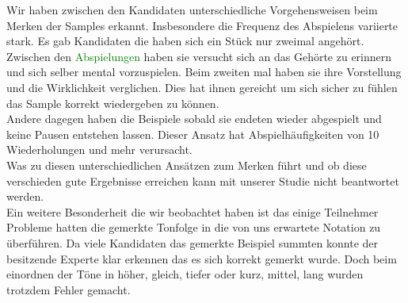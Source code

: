\documentclass{acm_proc_article-sp}
\begin{document}
Wir haben zwischen den Kandidaten unterschiedliche Vorgehensweisen beim Merken der Samples erkannt. Insbesondere die Frequenz des Abspielens variierte stark. Es gab Kandidaten die haben sich ein Stück nur zweimal angehört. Zwischen den \textcolor{green}{Abspielungen} haben sie versucht sich an das Gehörte zu erinnern und sich selber mental vorzuspielen. Beim zweiten mal haben sie ihre Vorstellung und die Wirklichkeit verglichen. Dies hat ihnen gereicht um sich sicher zu fühlen das Sample korrekt wiedergeben zu können.\\
Andere dagegen haben die Beispiele sobald sie endeten wieder abgespielt und keine Pausen entstehen lassen. Dieser Ansatz hat Abspielhäufigkeiten von 10 Wiederholungen und mehr verursacht.\\ 
Was zu diesen unterschiedlichen Ansätzen zum Merken führt und ob diese verschieden gute Ergebnisse erreichen kann mit unserer Studie nicht beantwortet werden.\\

Ein weitere Besonderheit die wir beobachtet haben ist das einige Teilnehmer Probleme hatten die gemerkte Tonfolge in die von uns erwartete Notation zu überführen. Da viele Kandidaten das gemerkte Beispiel summten konnte der besitzende Experte klar erkennen das es sich korrekt gemerkt wurde. Doch beim einordnen der Töne in höher, gleich, tiefer oder kurz, mittel, lang wurden trotzdem Fehler gemacht.
\end{document}

